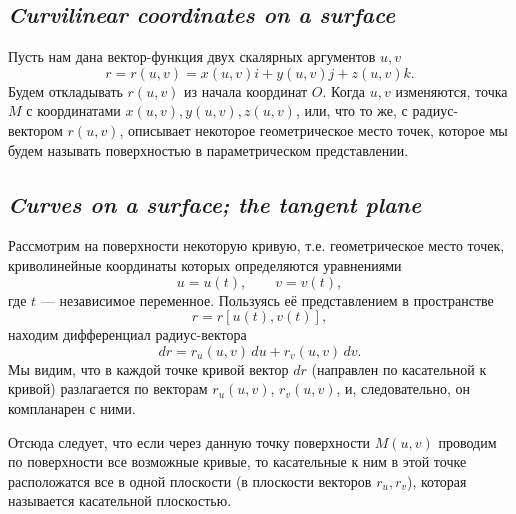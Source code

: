 \subsection*{ \textit{Curvilinear coordinates on a surface}}
\begin{rusblock}
Пусть нам дана вектор-функция двух скалярных аргументов $u,v$
\[
r=r(u,v)=x(u,v)i+y(u,v)j+z(u,v)k.
\]
Будем откладывать $r(u,v)$ из начала координат $O$. Когда $u,v$ изменяются, точка $M$ с координатами $x(u,v),y(u,v),z(u,v)$, или, что то же, с радиус-вектором $r(u,v)$, описывает некоторое геометрическое место точек, которое мы будем называть поверхностью в параметрическом представлении.
\end{rusblock}

\subsection*{ \textit{Curves on a surface; the tangent plane}}
\begin{rusblock}
Рассмотрим на поверхности некоторую кривую, т.е. геометрическое место точек, криволинейные координаты которых определяются уравнениями
\[
u=u(t),\qquad v=v(t),
\]
где $t$ --- независимое переменное. Пользуясь её представлением в пространстве
\[
r=r[u(t),v(t)],
\]
находим дифференциал радиус-вектора
\[
dr=r_u(u,v)\,du+r_v(u,v)\,dv.
\]
Мы видим, что в каждой точке кривой вектор $dr$ (направлен по касательной к кривой) разлагается по векторам $r_u(u,v)$, $r_v(u,v)$, и, следовательно, он компланарен с ними.

Отсюда следует, что если через данную точку поверхности $M(u,v)$ проводим по поверхности все возможные кривые, то касательные к ним в этой точке расположатся все в одной плоскости (в плоскости векторов $r_u,r_v$), которая называется касательной плоскостью.
\end{rusblock}

